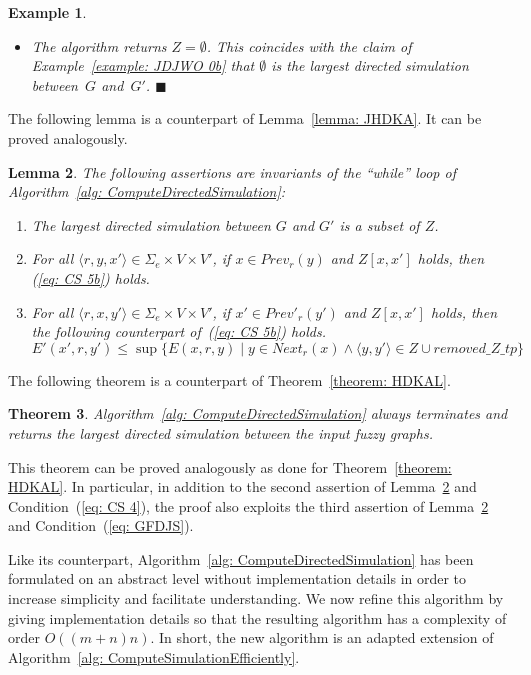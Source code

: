\documentclass[11pt]{article}
\def\tuple#1{\langle#1\rangle}
\def\eqref#1{(\ref{#1})}
\newcommand{\myend}{\mbox{}\hfill{\footnotesize$\blacksquare$}}
\newcommand{\SE}{\Sigma_e}
\newcommand{\Next}{\mathit{Next}}
\newcommand{\Prev}{\mathit{Prev}}
\newcommand{\PrevP}{\mathit{Prev}'}
\newcommand{\removeZ}{\textit{removed\_Z\_tp}}
\newtheorem{theorem}{Theorem}[section]
\newtheorem{lemma}[theorem]{Lemma}
\newtheorem{Example}[theorem]{Example}
\newenvironment{example}{\begin{Example}\begin{em}}{\end{em}\end{Example}}
\begin{document}
\begin{example}
\begin{itemize}
\item The algorithm returns $Z = \emptyset$. This coincides with the claim of Example~\ref{example: JDJWO 0b} that $\emptyset$ is the largest directed simulation between~$G$ and~$G'$. 
\myend
\end{itemize}
\end{example}


The following lemma is a counterpart of Lemma~\ref{lemma: JHDKA}. 
It can be proved analogously. 
 
\begin{lemma}\label{lemma: DJWYS}
The following assertions are invariants of the ``while'' loop of Algorithm~\ref{alg: ComputeDirectedSimulation}: 
\begin{enumerate}
\item The largest directed simulation between $G$ and $G'$ is a subset of $Z$.
\item For all $\tuple{r,y,x'} \in \SE \times V \times V'$, if $x \in \Prev_r(y)$ and $Z[x,x']$ holds, then \eqref{eq: CS 5b} holds.
\item For all $\tuple{r,x,y'} \in \SE \times V \times V'$, if $x' \in \PrevP_r(y')$ and $Z[x,x']$ holds, then the following counterpart of~\eqref{eq: CS 5b} holds.
	\begin{equation}\label{eq: JHFEK}
	E'(x',r,y') \leq \sup \{E(x,r,y) \mid y \in \Next_r(x) \land \tuple{y,y'} \in Z \cup \removeZ\}
	\end{equation}
\end{enumerate}
\end{lemma}

The following theorem is a counterpart of Theorem~\ref{theorem: HDKAL}. 
 
\begin{theorem}
Algorithm~\ref{alg: ComputeDirectedSimulation} always terminates and returns the largest directed simulation between the input fuzzy graphs.
\end{theorem}

This theorem can be proved analogously as done for Theorem~\ref{theorem: HDKAL}. In particular, in addition to the second assertion of Lemma~\ref{lemma: DJWYS} and Condition~\eqref{eq: CS 4}, the proof also exploits the third assertion of Lemma~\ref{lemma: DJWYS} and Condition~\eqref{eq: GFDJS}.  

Like its counterpart, Algorithm~\ref{alg: ComputeDirectedSimulation} has been formulated on an abstract level without implementation details in order to increase simplicity and facilitate understanding. We now refine this algorithm by giving implementation details so that the resulting algorithm has a complexity of order $O((m+n)n)$. In short, the new algorithm is an adapted extension of Algorithm~\ref{alg: ComputeSimulationEfficiently}. 
\end{document}
